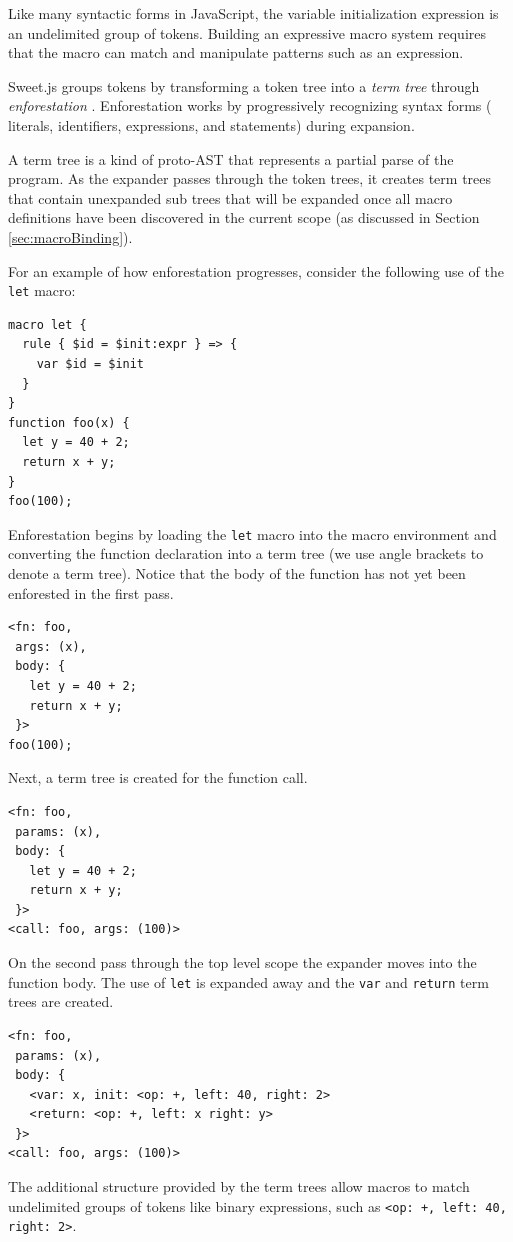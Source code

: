 \documentclass[preprint,10pt]{sigplanconf}
\begin{document}
Like many syntactic forms in JavaScript, the variable initialization
expression is an undelimited group of tokens. Building an expressive
macro system requires that the macro can match and manipulate patterns
such as an expression.

Sweet.js groups tokens by
transforming a token tree into a
\emph{term tree} through \emph{enforestation} \cite{Rafkind2013}.
Enforestation works by progressively recognizing syntax forms (\eg
literals, identifiers, expressions, and statements) during expansion.

A term tree is a kind of proto-AST that represents a partial parse of
the program. As the expander passes through the token trees, it
creates term trees that contain unexpanded sub trees that will be
expanded once all macro definitions have been discovered in the
current scope (as discussed in Section \ref{sec:macroBinding}).

For an example of how enforestation progresses, consider the following
use of the \verb!let! macro:
\begin{lstlisting}
macro let {
  rule { $id = $init:expr } => {
    var $id = $init
  }
}
function foo(x) {
  let y = 40 + 2;
  return x + y;
}
foo(100);
\end{lstlisting}
Enforestation begins by loading the \verb!let! macro into the
macro environment and converting the function declaration into a term
tree (we use angle brackets to denote a term tree). Notice that the
body of the function has not yet been enforested in the first pass.
\begin{lstlisting}
<fn: foo, 
 args: (x), 
 body: {
   let y = 40 + 2;
   return x + y;
 }>
foo(100);
\end{lstlisting}
Next, a term tree is created for the function call.
\begin{lstlisting}
<fn: foo, 
 params: (x), 
 body: {
   let y = 40 + 2;
   return x + y;
 }>
<call: foo, args: (100)>
\end{lstlisting}
On the second pass through the top level scope the expander moves into
the function body. The use of \verb!let! is expanded away and the
\verb!var! and \verb!return! term trees are created.
\begin{lstlisting}
<fn: foo, 
 params: (x), 
 body: {
   <var: x, init: <op: +, left: 40, right: 2>
   <return: <op: +, left: x right: y> 
 }>
<call: foo, args: (100)>
\end{lstlisting}

The additional structure provided by the term trees allow macros to
match undelimited groups of tokens like binary expressions, such as
\verb!<op: +, left: 40, right: 2>!.
\end{document}

